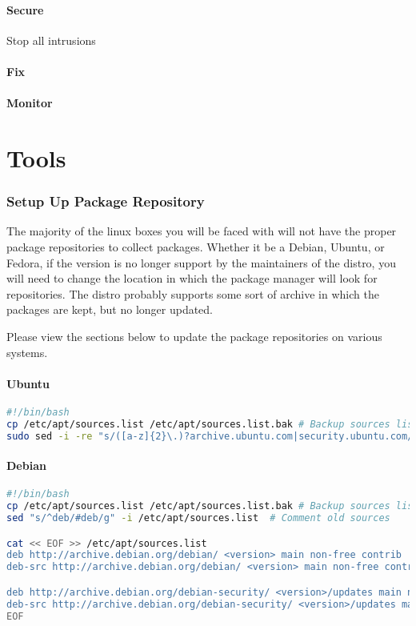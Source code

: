 \documentclass{article}
\begin{document}
\subsection{Secure}
Stop all intrusions

\subsection{Fix}

\subsection{Monitor}

\part{Tools}
\section{Setup Up Package Repository}
The majority of the linux boxes you will be faced with will not have the proper
package repositories to collect packages. Whether it be a Debian, Ubuntu, or
Fedora, if the version is no longer support by the maintainers of the distro,
you will need to change the location in which the package manager will look for
repositories. The distro probably supports some sort of archive in which the
packages are kept, but no longer updated. 

Please view the sections below to update the package repositories on various
systems.

\subsection{Ubuntu}
\begin{lstlisting}[language=bash]
#!/bin/bash
cp /etc/apt/sources.list /etc/apt/sources.list.bak # Backup sources list
sudo sed -i -re "s/([a-z]{2}\.)?archive.ubuntu.com|security.ubuntu.com/old-releases.ubuntu.com/g" /etc/apt/sources.list
\end{lstlisting}

\subsection{Debian}
\begin{lstlisting}[language=bash]
#!/bin/bash
cp /etc/apt/sources.list /etc/apt/sources.list.bak # Backup sources list
sed "s/^deb/#deb/g" -i /etc/apt/sources.list  # Comment old sources

cat << EOF >> /etc/apt/sources.list
deb http://archive.debian.org/debian/ <version> main non-free contrib
deb-src http://archive.debian.org/debian/ <version> main non-free contrib

deb http://archive.debian.org/debian-security/ <version>/updates main non-free contrib
deb-src http://archive.debian.org/debian-security/ <version>/updates main non-free contrib
EOF
\end{lstlisting}
\end{document}
